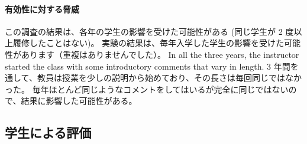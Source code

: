 \paragraph{有効性に対する脅威}
この調査の結果は、各年の学生の影響を受けた可能性がある (同じ学生が 2 度以上履修したことはない)。
実験の結果は、毎年入学した学生の影響を受けた可能性があります（重複はありませんでした）。
In all the three years, 
the instructor started the class with some introductory comments that
vary in length.
3 年間を通して、教員は授業を少しの説明から始めており、その長さは毎回同じではなかった。
毎年ほとんど同じようなコメントをしてはいるが完全に同じではないので、結果に影響した可能性がある。

\subsection{学生による評価}
\label{subsection:result__students}


